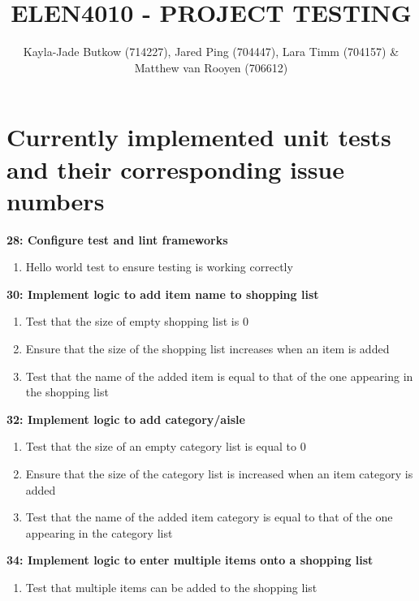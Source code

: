 \documentclass[10pt,onecolumn]{witseiepaper}
\title{ELEN4010 - PROJECT TESTING}
\author{Kayla-Jade Butkow (714227), Jared Ping (704447), Lara Timm (704157) \& Matthew van Rooyen (706612)}
\begin{document}
\maketitle
\pagestyle{plain}
\setcounter{page}{1}

\section*{Currently implemented unit tests and their corresponding issue numbers}

\textbf{28: Configure test and lint frameworks}

\begin{enumerate}
	\item Hello world test to ensure testing is working correctly
\end{enumerate}

\textbf{30: Implement logic to add item name to shopping list}

\begin{enumerate}
	\item Test that the size of empty shopping list is 0
	\item Ensure that the size of the shopping list increases when an item is added
	\item Test that the name of the added item is equal to that of the one appearing in the shopping list
\end{enumerate}

\textbf{32: Implement logic to add category/aisle}

\begin{enumerate}
	\item Test that the size of an empty category list is equal to 0
	\item Ensure that the size of the category list is increased when an item category is added
	\item Test that the name of the added item category is equal to that of the one appearing in the category list
\end{enumerate}

\textbf{34: Implement logic to enter multiple items onto a shopping list}

\begin{enumerate}
	\item Test that multiple items can be added to the shopping list
\end{enumerate}
\end{document}
